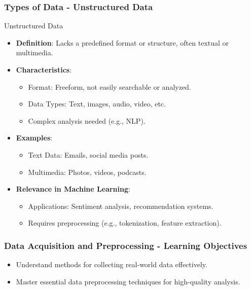 \documentclass[aspectratio=169]{beamer}
\begin{document}
\begin{frame}[fragile]
    \frametitle{Types of Data - Unstructured Data}
    \begin{block}{Unstructured Data}
        \begin{itemize}
            \item \textbf{Definition}: Lacks a predefined format or structure, often textual or multimedia.
            \item \textbf{Characteristics}:
            \begin{itemize}
                \item Format: Freeform, not easily searchable or analyzed.
                \item Data Types: Text, images, audio, video, etc.
                \item Complex analysis needed (e.g., NLP).
            \end{itemize}
            \item \textbf{Examples}:
            \begin{itemize}
                \item Text Data: Emails, social media posts.
                \item Multimedia: Photos, videos, podcasts.
            \end{itemize}
            \item \textbf{Relevance in Machine Learning}:
            \begin{itemize}
                \item Applications: Sentiment analysis, recommendation systems.
                \item Requires preprocessing (e.g., tokenization, feature extraction).
            \end{itemize}
        \end{itemize}
    \end{block}
\end{frame}

\begin{frame}[fragile]
    \frametitle{Data Acquisition and Preprocessing - Learning Objectives}
    \begin{itemize}
        \item Understand methods for collecting real-world data effectively.
        \item Master essential data preprocessing techniques for high-quality analysis.
    \end{itemize}
\end{frame}
\end{document}
